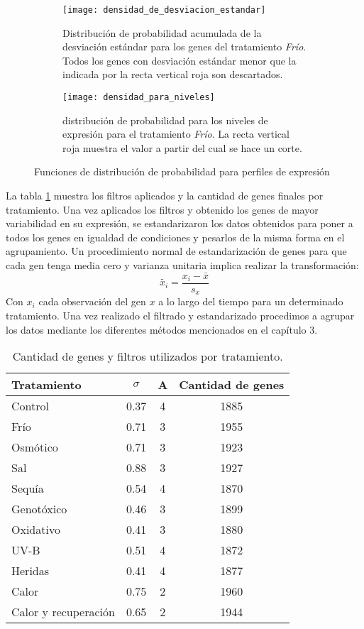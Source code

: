 \begin{figure*}[t!]
    \centering
    \begin{subfigure}[t]{0.4\textwidth}
    \centering
    \texttt{[image: densidad\_de\_desviacion\_estandar]}
    \caption{Distribución de probabilidad acumulada de la desviación estándar para los genes del tratamiento \textit{Frío}. Todos los genes con desviación estándar menor que la indicada por la recta vertical roja son descartados.}
    \label{fig:densidad_de_desviacion_estandar}
    \end{subfigure}
    \begin{subfigure}[t]{0.4\textwidth}
    \centering
    \texttt{[image: densidad\_para\_niveles]}
    \caption{distribución de probabilidad para los niveles de expresión para el tratamiento \textit{Frío}. La recta vertical roja muestra el valor a partir del cual se hace un corte.}
    \label{fig:densidad_para_niveles}
    \end{subfigure}
    \caption{Funciones de distribución de probabilidad para perfiles de expresión}
\end{figure*}
La tabla \ref{tabla:genes_por_tratamiento} muestra los filtros aplicados y la cantidad de genes finales por tratamiento.
Una vez aplicados los filtros y obtenido los genes de mayor variabilidad en su expresión, se estandarizaron los datos obtenidos para poner a todos los genes en igualdad de condiciones y pesarlos de la misma forma en el agrupamiento. Un procedimiento normal de estandarización de genes para que cada gen tenga media cero y varianza unitaria implica realizar la transformación:
\begin{equation}
	\tilde{x_i} = \frac{x_i-\bar{x}}{s_x}
\end{equation}
Con $x_i$ cada observación del gen $x$ a lo largo del tiempo para un determinado tratamiento. Una vez realizado el filtrado y estandarizado procedimos a agrupar los datos mediante los diferentes métodos mencionados en el capítulo 3.
\begin{table}[t]
  \centering
\begin{tabular}{| l | c | c | c |}
\hline
Tratamiento & $\sigma$ & A & Cantidad de genes \\
\hline
Control & 0.37 & 4 & 1885 \\
\hline
Frío & 0.71 & 3 & 1955 \\
\hline
Osmótico & 0.71 & 3 & 1923 \\
\hline
Sal & 0.88 & 3 & 1927 \\
\hline
Sequía & 0.54 & 4 & 1870 \\
\hline
Genotóxico & 0.46 & 3 & 1899 \\
\hline
Oxidativo & 0.41 & 3 & 1880 \\
\hline
UV-B & 0.51 & 4 & 1872 \\
\hline
Heridas & 0.41 & 4 & 1877 \\
\hline
Calor & 0.75 & 2 & 1960 \\
\hline
Calor y recuperación & 0.65 & 2 & 1944 \\
\hline                                         
\end{tabular}
\caption{Cantidad de genes y filtros utilizados por tratamiento.}
\label{tabla:genes_por_tratamiento}
\end{table}
